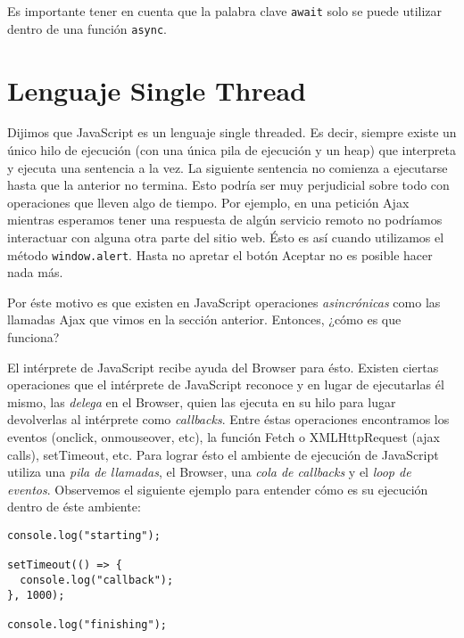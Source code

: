 \documentclass[a4paper, oneside, titlepage, 12pt]{paper}
\begin{document}
Es importante tener en cuenta que la palabra clave \texttt{await} solo se puede utilizar dentro de una función \texttt{async}.

\section{Lenguaje Single Thread} \label{single_thread}

Dijimos que JavaScript es un lenguaje single threaded. Es decir, siempre existe un único hilo de ejecución (con una única pila de ejecución y un heap) que interpreta y ejecuta una sentencia a la vez. La siguiente sentencia no comienza a ejecutarse hasta que la anterior no termina. Esto podría ser muy perjudicial sobre todo con operaciones que lleven algo de tiempo. Por ejemplo, en una petición Ajax mientras esperamos tener una respuesta de algún servicio remoto no podríamos interactuar con alguna otra parte del sitio web. Ésto es así cuando utilizamos el método \texttt{window.alert}. Hasta no apretar el botón Aceptar no es posible hacer nada más.
\newline

Por éste motivo es que existen en JavaScript operaciones \textit{asincrónicas} como las llamadas Ajax que vimos en la sección anterior. Entonces, ¿cómo es que funciona?
\newline

El intérprete de JavaScript recibe ayuda del Browser para ésto. Existen ciertas operaciones que el intérprete de JavaScript reconoce y en lugar de ejecutarlas él mismo, las \textit{delega} en el Browser, quien las ejecuta en su hilo para lugar devolverlas al intérprete como \textit{callbacks}. Entre éstas operaciones encontramos los eventos (onclick, onmouseover, etc), la función Fetch o XMLHttpRequest (ajax calls), setTimeout, etc. Para lograr ésto el ambiente de ejecución de JavaScript utiliza una \textit{pila de llamadas}, el Browser, una \textit{cola de callbacks} y el \textit{loop de eventos}. Observemos el siguiente ejemplo para entender cómo es su ejecución dentro de éste ambiente:

\begin{verbatim}
console.log("starting");

setTimeout(() => {
  console.log("callback");
}, 1000);

console.log("finishing");
\end{verbatim}
\end{document}

